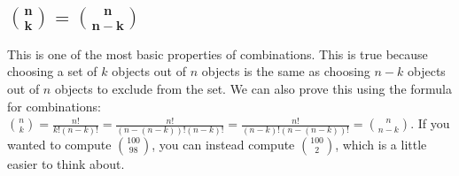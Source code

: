 \documentclass[twocolumn]{article}
\begin{document}
\subsection*{$\mathbf{\binom{n}{k} = \binom{n}{n - k}}$}
This is one of the most basic properties of combinations.
This is true because choosing a set of $k$ objects out of $n$ objects is the same as choosing $n - k$ objects out of $n$ objects to exclude from the set.
We can also prove this using the formula for combinations: $\binom{n}{k} = \frac{n!}{k!(n - k)!} = \frac{n!}{(n - (n - k))!(n - k)!} = \frac{n!}{(n - k)!(n - (n - k))!} = \binom{n}{n - k}$.
If you wanted to compute $\binom{100}{98}$, you can instead compute $\binom{100}{2}$, which is a little easier to think about.
\end{document}
